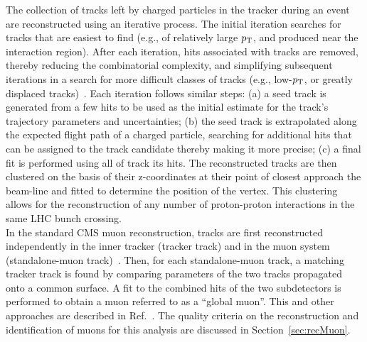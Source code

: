 

\indent The collection of tracks left by charged particles in the tracker during an event are 
reconstructed using an iterative process. The initial iteration searches for tracks 
that are easiest to find (e.g., of relatively large $p_{\mathrm{T}}$, and produced near the 
interaction region). After each iteration, hits associated with tracks are removed, 
thereby reducing the combinatorial complexity, and simplifying subsequent iterations 
in a search for more difficult classes of tracks (e.g., low-$p_{\mathrm{T}}$, or greatly displaced
tracks)~\cite{Chatrchyan:2014fea}. Each iteration follows similar steps: (a) a seed 
track is generated from a few hits to be used as the initial estimate for the track's 
trajectory parameters and uncertainties; (b) the seed track is extrapolated along the 
expected flight path of a charged particle, searching for additional hits that can be 
assigned to the track candidate thereby making it more precise; (c) a final fit is performed 
using all of track its hits. The reconstructed tracks are then clustered on the basis of 
their z-coordinates at their point of closest approach the beam-line and fitted to determine 
the position of the vertex. This clustering allows for the reconstruction of any number 
of proton-proton interactions in the same LHC bunch crossing.\\
\indent In the standard CMS muon reconstruction, tracks are first reconstructed independently 
in the inner tracker (tracker track) and in the muon system (standalone-muon 
track)~\cite{1748-0221-7-10-P10002}. Then, for each standalone-muon track, a matching tracker 
track is found by comparing parameters of the two tracks propagated onto a common surface. A 
fit to the combined hits of the two subdetectors is performed to obtain a muon referred to as 
a ``global muon''. This and other approaches are described in Ref.~\cite{PAS-MUO-10-002}. The 
quality criteria on the reconstruction and identification of muons for this analysis are 
discussed in Section~\ref{sec:recMuon}. \\
